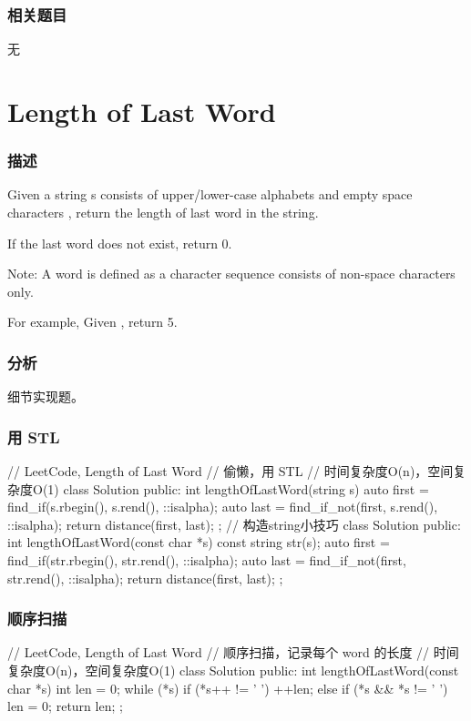 \subsubsection{相关题目}
\begindot
\item 无
\myenddot


\section{Length of Last Word} %
\label{sec:length-of-last-word}


\subsubsection{描述}
Given a string s consists of upper/lower-case alphabets and empty space characters , return the length of last word in the string.

If the last word does not exist, return 0.

Note: A word is defined as a character sequence consists of non-space characters only.

For example, 
Given ,
return 5.


\subsubsection{分析}
细节实现题。


\subsubsection{用 STL}
\begin{Code}
// LeetCode, Length of Last Word
// 偷懒，用 STL
// 时间复杂度O(n)，空间复杂度O(1)
class Solution {
public:
    int lengthOfLastWord(string s) {
        auto first = find_if(s.rbegin(), s.rend(), ::isalpha);
        auto last = find_if_not(first, s.rend(), ::isalpha);
        return distance(first, last);
    }
};
// 构造string小技巧
class Solution {
public:
    int lengthOfLastWord(const char *s) {
        const string str(s);
        auto first = find_if(str.rbegin(), str.rend(), ::isalpha);
        auto last = find_if_not(first, str.rend(), ::isalpha);
        return distance(first, last);
    }
};
\end{Code}


\subsubsection{顺序扫描}
\begin{Code}
// LeetCode, Length of Last Word
// 顺序扫描，记录每个 word 的长度
// 时间复杂度O(n)，空间复杂度O(1)
class Solution {
public:
    int lengthOfLastWord(const char *s) {
        int len = 0;
        while (*s) {
            if (*s++ != ' ')
                ++len;
            else if (*s && *s != ' ')
                len = 0;
        }
        return len;
    }
};
\end{Code}

